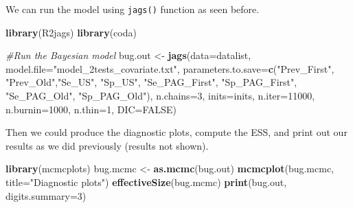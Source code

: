 \documentclass[
]{book}
\newenvironment{Shaded}{\begin{snugshade}}{\end{snugshade}}
\newcommand{\AttributeTok}[1]{\textcolor[rgb]{0.13,0.29,0.53}{#1}}
\newcommand{\CommentTok}[1]{\textcolor[rgb]{0.56,0.35,0.01}{\textit{#1}}}
\newcommand{\ConstantTok}[1]{\textcolor[rgb]{0.56,0.35,0.01}{#1}}
\newcommand{\DecValTok}[1]{\textcolor[rgb]{0.00,0.00,0.81}{#1}}
\newcommand{\FunctionTok}[1]{\textcolor[rgb]{0.13,0.29,0.53}{\textbf{#1}}}
\newcommand{\NormalTok}[1]{#1}
\newcommand{\OtherTok}[1]{\textcolor[rgb]{0.56,0.35,0.01}{#1}}
\newcommand{\StringTok}[1]{\textcolor[rgb]{0.31,0.60,0.02}{#1}}
\begin{document}
We can run the model using \texttt{jags()} function as seen before.

\begin{Shaded}
\begin{Highlighting}[]
\FunctionTok{library}\NormalTok{(R2jags)}
\FunctionTok{library}\NormalTok{(coda)}

\CommentTok{\#Run the Bayesian model}
\NormalTok{bug.out }\OtherTok{\textless{}{-}} \FunctionTok{jags}\NormalTok{(}\AttributeTok{data=}\NormalTok{datalist,                             }
               \AttributeTok{model.file=}\StringTok{"model\_2tests\_covariate.txt"}\NormalTok{,     }
               \AttributeTok{parameters.to.save=}\FunctionTok{c}\NormalTok{(}\StringTok{"Prev\_First"}\NormalTok{, }\StringTok{"Prev\_Old"}\NormalTok{,}\StringTok{"Se\_US"}\NormalTok{, }\StringTok{"Sp\_US"}\NormalTok{, }\StringTok{"Se\_PAG\_First"}\NormalTok{, }\StringTok{"Sp\_PAG\_First"}\NormalTok{, }\StringTok{"Se\_PAG\_Old"}\NormalTok{, }\StringTok{"Sp\_PAG\_Old"}\NormalTok{),               }
               \AttributeTok{n.chains=}\DecValTok{3}\NormalTok{,                                 }
               \AttributeTok{inits=}\NormalTok{inits,                                }
               \AttributeTok{n.iter=}\DecValTok{11000}\NormalTok{,                                }
               \AttributeTok{n.burnin=}\DecValTok{1000}\NormalTok{,                              }
               \AttributeTok{n.thin=}\DecValTok{1}\NormalTok{,                                   }
               \AttributeTok{DIC=}\ConstantTok{FALSE}\NormalTok{)                                   }
\end{Highlighting}
\end{Shaded}

Then we could produce the diagnostic plots, compute the ESS, and print out our results as we did previously (results not shown).

\begin{Shaded}
\begin{Highlighting}[]
\FunctionTok{library}\NormalTok{(mcmcplots)}
\NormalTok{bug.mcmc }\OtherTok{\textless{}{-}} \FunctionTok{as.mcmc}\NormalTok{(bug.out)          }
\FunctionTok{mcmcplot}\NormalTok{(bug.mcmc, }\AttributeTok{title=}\StringTok{"Diagnostic plots"}\NormalTok{) }
\FunctionTok{effectiveSize}\NormalTok{(bug.mcmc)}
\FunctionTok{print}\NormalTok{(bug.out, }\AttributeTok{digits.summary=}\DecValTok{3}\NormalTok{) }
\end{Highlighting}
\end{Shaded}
\end{document}
